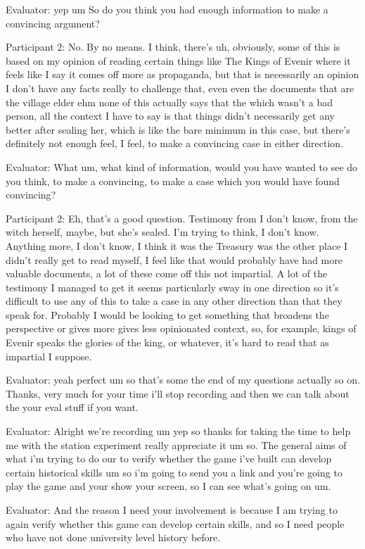 \documentclass{l4proj}
\begin{document}
\begin{appendices}
Evaluator: yep um So do you think you had enough information to make a convincing argument?

Participant 2: No. By no means. I think, there’s uh, obviously, some of this is based on my opinion of reading certain things like The Kings of Evenir where it feels like I say it comes off more as propaganda, but that is necessarily an opinion I don't have any facts really to challenge that, even even the documents that are the village elder ehm none of this actually says that the which wasn't a bad person, all the context I have to say is that things didn't necessarily get any better after sealing her, which is like the bare minimum in this case, but there's definitely not enough feel, I feel, to make a convincing case in either direction.

Evaluator: What um, what kind of information, would you have wanted to see do you think, to make a convincing, to make a case which you would have found convincing?

Participant 2: Eh, that’s a good question. Testimony from I don’t know, from the witch herself, maybe, but she’s sealed. I’m trying to think, I don’t know. Anything more, I don’t know, I think it was the Treasury was the other place I didn't really get to read myself, I feel like that would probably have had more valuable documents, a lot of these come off this not impartial. A lot of the testimony I managed to get it seems particularly sway in one direction so it's difficult to use any of this to take a case in any other direction than that they speak for. Probably I would be looking to get something that broadens the perspective or gives more gives less opinionated context, so, for example, kings of Evenir speaks the glories of the king, or whatever, it’s hard to read that as impartial I suppose. 

Evaluator: yeah perfect um so that's some the end of my questions actually so on. Thanks, very much for your time i'll stop recording and then we can talk about the your eval stuff if you want.

Evaluator: Alright we're recording um yep so thanks for taking the time to help me with the station experiment really appreciate it um so. The general aims of what i'm trying to do our to verify whether the game i've built can develop certain historical skills um so i'm going to send you a link and you're going to play the game and your show your screen, so I can see what's going on um.

Evaluator: And the reason I need your involvement is because I am trying to again verify whether this game can develop certain skills, and so I need people who have not done university level history before.


\end{appendices}
\end{document}
